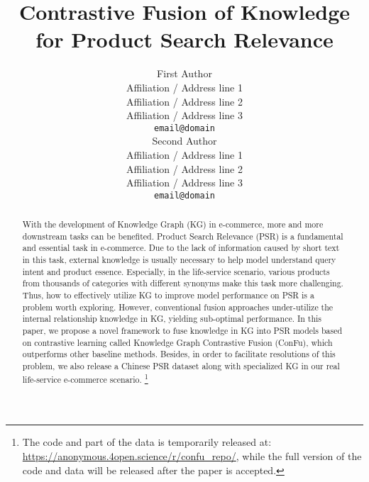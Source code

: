 \documentclass[11pt]{article}
\title{Contrastive Fusion of Knowledge for Product Search Relevance}
\author{First Author \\
  Affiliation / Address line 1 \\
  Affiliation / Address line 2 \\
  Affiliation / Address line 3 \\
  \texttt{email@domain} \\\And
  Second Author \\
  Affiliation / Address line 1 \\
  Affiliation / Address line 2 \\
  Affiliation / Address line 3 \\
\texttt{email@domain} \\}
\begin{document}
\maketitle
\begin{abstract}
  With the development of Knowledge Graph (KG) in e-commerce, more and more downstream tasks can be benefited. 
  Product Search Relevance (PSR) is a fundamental and essential task in e-commerce. 
  Due to the lack of information caused by short text in this task, external knowledge is usually necessary to help model understand query intent and product essence. 
  Especially, in the life-service scenario, various products from thousands of categories with different synonyms make this task more challenging. 
  Thus, how to effectively utilize KG to improve model performance on PSR is a problem worth exploring. 
  However, conventional fusion approaches under-utilize the internal relationship knowledge in KG, yielding sub-optimal performance. 
  In this paper, we propose a novel framework to fuse knowledge in KG into PSR models based on contrastive learning called Knowledge Graph Contrastive Fusion (ConFu), which outperforms other baseline methods. 
  Besides, in order to facilitate resolutions of this problem, we also release a Chinese PSR dataset along with specialized KG in our real life-service e-commerce scenario.
  \footnote{The code and part of the data is temporarily released at: \url{https://anonymous.4open.science/r/confu_repo/}, while the full version of the code and data will be released after the paper is accepted.}
\end{abstract}









\end{document}
